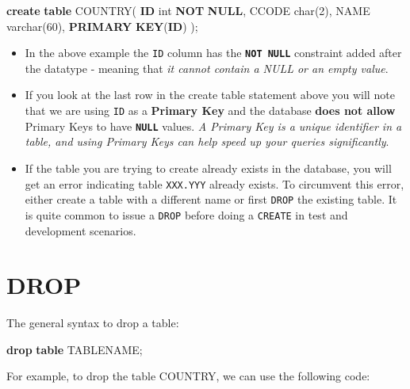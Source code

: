 \documentclass[
]{book}
\newenvironment{Shaded}{\begin{snugshade}}{\end{snugshade}}
\newcommand{\DataTypeTok}[1]{\textcolor[rgb]{0.13,0.29,0.53}{#1}}
\newcommand{\DecValTok}[1]{\textcolor[rgb]{0.00,0.00,0.81}{#1}}
\newcommand{\KeywordTok}[1]{\textcolor[rgb]{0.13,0.29,0.53}{\textbf{#1}}}
\newcommand{\NormalTok}[1]{#1}
\begin{document}
\begin{Shaded}
\begin{Highlighting}[]
\KeywordTok{create} \KeywordTok{table}\NormalTok{ COUNTRY(}
    \KeywordTok{ID} \DataTypeTok{int} \KeywordTok{NOT} \KeywordTok{NULL}\NormalTok{,}
\NormalTok{    CCODE }\DataTypeTok{char}\NormalTok{(}\DecValTok{2}\NormalTok{),}
\NormalTok{    NAME }\DataTypeTok{varchar}\NormalTok{(}\DecValTok{60}\NormalTok{),}
    \KeywordTok{PRIMARY} \KeywordTok{KEY}\NormalTok{(}\KeywordTok{ID}\NormalTok{)}
\NormalTok{);}
\end{Highlighting}
\end{Shaded}

\begin{itemize}
\item
  In the above example the \texttt{ID} column has the {\textbf{\texttt{NOT\ NULL}}} constraint added after the datatype - meaning that \emph{it cannot contain a NULL or an empty value}.
\item
  If you look at the last row in the create table statement above you will note that we are using \texttt{ID} as a {\textbf{Primary Key}} and the database \textbf{does not allow} Primary Keys to have \textbf{\texttt{NULL}} values. \emph{A Primary Key is a unique identifier in a table, and using Primary Keys can help speed up your queries significantly}.
\item
  If the table you are trying to create already exists in the database, you will get an error indicating table \texttt{XXX.YYY} already exists. To circumvent this error, either create a table with a different name or first \texttt{DROP} the existing table. It is quite common to issue a \texttt{DROP} before doing a \texttt{CREATE} in test and development scenarios.
\end{itemize}

\hypertarget{drop}{%
\section{DROP}\label{drop}}

The general syntax to drop a table:

\begin{Shaded}
\begin{Highlighting}[]
\KeywordTok{drop} \KeywordTok{table}\NormalTok{ TABLENAME;}
\end{Highlighting}
\end{Shaded}

For example, to drop the table COUNTRY, we can use the following code:
\end{document}
